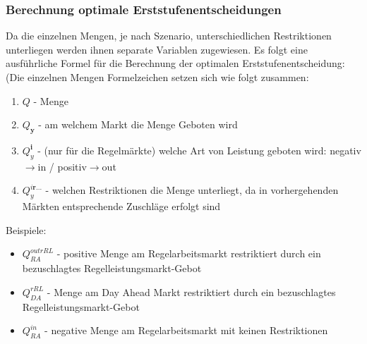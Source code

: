 \documentclass{article}
\begin{document}
\subsubsection{Berechnung optimale Erststufenentscheidungen}

Da die einzelnen Mengen, je nach Szenario, unterschiedlichen Restriktionen unterliegen werden ihnen separate Variablen zugewiesen.
Es folgt eine ausführliche Formel für die Berechnung der optimalen Erststufenentscheidung:
(Die einzelnen Mengen Formelzeichen setzen sich wie folgt zusammen:
\begin{enumerate}
    \item $Q$ - Menge
    \item $Q_{\pmb{y}}$ - am welchem Markt die Menge Geboten wird
    \item $Q^{\pmb{i}}_{y}$ - (nur für die Regelmärkte) welche Art von Leistung geboten wird: negativ$\rightarrow$in / positiv$\rightarrow$out
    \item $Q^{i\pmb{r...}}_{y}$ - welchen Restriktionen die Menge unterliegt, da in vorhergehenden Märkten entsprechende Zuschläge erfolgt sind
\end{enumerate}
Beispiele: 
\begin{itemize}
    \item $Q^{outrRL}_{RA}$ - positive Menge am Regelarbeitsmarkt restriktiert durch ein bezuschlagtes Regelleistungsmarkt-Gebot
    \item $Q^{rRL}_{DA}$ - Menge am Day Ahead Markt restriktiert durch ein bezuschlagtes Regelleistungsmarkt-Gebot
    \item $Q^{in}_{RA}$ - negative Menge am Regelarbeitsmarkt mit keinen Restriktionen 
\end{itemize}
\end{document}
